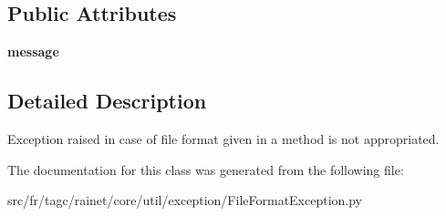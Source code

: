 \subsection*{Public Attributes}
\begin{DoxyCompactItemize}
\item 
\hypertarget{classsrc_1_1fr_1_1tagc_1_1rainet_1_1core_1_1util_1_1exception_1_1FileFormatException_1_1FileFormatException_aa199dfd8c7e58f6832074ee235628f21}{}{\bfseries message}\label{classsrc_1_1fr_1_1tagc_1_1rainet_1_1core_1_1util_1_1exception_1_1FileFormatException_1_1FileFormatException_aa199dfd8c7e58f6832074ee235628f21}

\end{DoxyCompactItemize}


\subsection{Detailed Description}
Exception raised in case of file format given in a method is not appropriated. 

The documentation for this class was generated from the following file\+:\begin{DoxyCompactItemize}
\item 
src/fr/tagc/rainet/core/util/exception/File\+Format\+Exception.\+py\end{DoxyCompactItemize}
